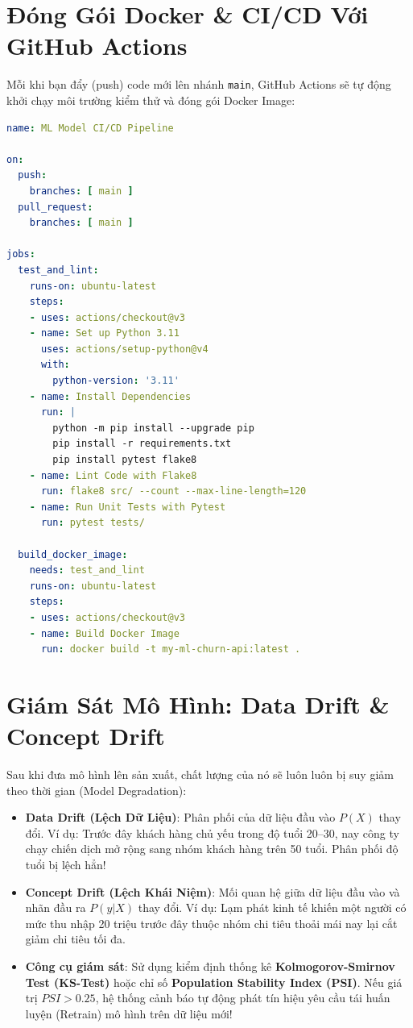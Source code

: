 \section{Đóng Gói Docker \& CI/CD Với GitHub Actions}

\begin{thuchanhbox}
Mỗi khi bạn đẩy (push) code mới lên nhánh \texttt{main}, GitHub Actions sẽ tự động khởi chạy môi trường kiểm thử và đóng gói Docker Image:

\begin{lstlisting}[language=yaml]
name: ML Model CI/CD Pipeline

on:
  push:
    branches: [ main ]
  pull_request:
    branches: [ main ]

jobs:
  test_and_lint:
    runs-on: ubuntu-latest
    steps:
    - uses: actions/checkout@v3
    - name: Set up Python 3.11
      uses: actions/setup-python@v4
      with:
        python-version: '3.11'
    - name: Install Dependencies
      run: |
        python -m pip install --upgrade pip
        pip install -r requirements.txt
        pip install pytest flake8
    - name: Lint Code with Flake8
      run: flake8 src/ --count --max-line-length=120
    - name: Run Unit Tests with Pytest
      run: pytest tests/

  build_docker_image:
    needs: test_and_lint
    runs-on: ubuntu-latest
    steps:
    - uses: actions/checkout@v3
    - name: Build Docker Image
      run: docker build -t my-ml-churn-api:latest .
\end{lstlisting}
\end{thuchanhbox}

\section{Giám Sát Mô Hình: Data Drift \& Concept Drift}

Sau khi đưa mô hình lên sản xuất, chất lượng của nó sẽ luôn luôn bị suy giảm theo thời gian (Model Degradation):
\begin{itemize}
    \item \textbf{Data Drift (Lệch Dữ Liệu)}: Phân phối của dữ liệu đầu vào $P(X)$ thay đổi. Ví dụ: Trước đây khách hàng chủ yếu trong độ tuổi 20--30, nay công ty chạy chiến dịch mở rộng sang nhóm khách hàng trên 50 tuổi. Phân phối độ tuổi bị lệch hẳn!
    \item \textbf{Concept Drift (Lệch Khái Niệm)}: Mối quan hệ giữa dữ liệu đầu vào và nhãn đầu ra $P(y|X)$ thay đổi. Ví dụ: Lạm phát kinh tế khiến một người có mức thu nhập 20 triệu trước đây thuộc nhóm chi tiêu thoải mái nay lại cắt giảm chi tiêu tối đa.
    \item \textbf{Công cụ giám sát}: Sử dụng kiểm định thống kê \textbf{Kolmogorov-Smirnov Test (KS-Test)} hoặc chỉ số \textbf{Population Stability Index (PSI)}. Nếu giá trị $PSI > 0.25$, hệ thống cảnh báo tự động phát tín hiệu yêu cầu tái huấn luyện (Retrain) mô hình trên dữ liệu mới!
\end{itemize}

